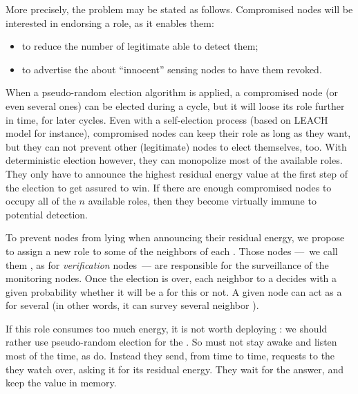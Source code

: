 More precisely, the problem may be stated as follows.
Compromised nodes will be interested in endorsing a \cn role, as it enables them:
\begin{itemize}
    \item to reduce the number of legitimate \cns able to detect them;
    \item to advertise the \ch about ``innocent'' sensing nodes to have them revoked.
\end{itemize}
When a pseudo-random election algorithm is applied, a compromised node (or even several ones) can be elected during a cycle, but it will loose its role further in time, for later cycles.
Even with a self-election process (based on LEACH~\cite{HHT02} model for instance), compromised nodes can keep their \cn role as long as they want, but they can not prevent other (legitimate) nodes to elect themselves, too.
With deterministic election however, they can monopolize most of the available \cn roles.
They only have to announce the highest residual energy value at the first step of the election to get assured to win.
If there are enough compromised nodes to occupy all of the $n$ available \cn roles, then they become virtually immune to potential detection.

To prevent nodes from lying when announcing their residual energy, we propose to assign a new role to some of the neighbors of each \cn.
Those nodes ---~we call them \vns, as for \emph{verification} nodes~--- are responsible for the surveillance of the monitoring nodes.
Once the \cns election is over, each neighbor to a \cn decides with a given probability whether it will be a \vn for this \cn or not.
A given node can act as a \vn for several \cn (in other words, it can survey several neighbor \cn).

If this role consumes too much energy, it is not worth deploying \vns: we should rather use pseudo-random election for the \cns.
So \vns must not stay awake and listen most of the time, as \cns do.
Instead they send, from time to time, requests to the \cn they watch over, asking it for its residual energy.
They wait for the answer, and keep the value in memory.

